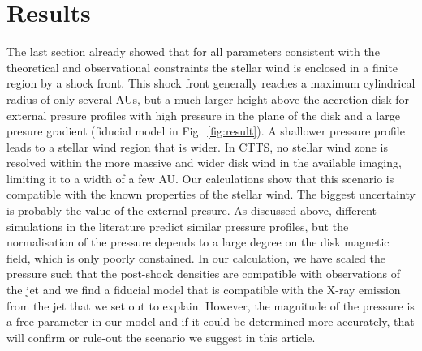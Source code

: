\section{Results}
\label{sect:results}
The last section already showed that for all parameters consistent with the theoretical and observational constraints the stellar wind is enclosed in a finite region by a shock front. This shock front generally reaches a maximum cylindrical radius of only several AUs, but a much larger height above the accretion disk for external presure profiles with high pressure in the plane of the disk and a large presure gradient (fiducial model in Fig.~\ref{fig:result}). A shallower pressure profile leads to a stellar wind region that is wider. In CTTS, no stellar wind zone is resolved within the more massive and wider disk wind in the available imaging, limiting it to a width of a few AU. Our calculations show that this scenario is compatible with the known properties of the stellar wind. The biggest uncertainty is probably the value of the external presure. As discussed above, different simulations in the literature predict similar pressure profiles, but the normalisation of the pressure depends to a large degree on the disk magnetic field, which is only poorly constained. In our calculation, we have scaled the pressure such that the post-shock densities are compatible with observations of the jet and we find a fiducial model that is compatible with the X-ray emission from the jet that we set out to explain. However, the magnitude of the pressure is a free parameter in our model and if it could be determined more accurately, that will confirm or rule-out the scenario we suggest in this article.

